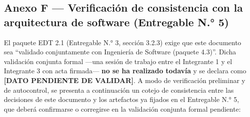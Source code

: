 \documentclass[11pt,a4paper]{article}
\begin{document}
\subsection{Anexo F --- Verificación de consistencia con la arquitectura de software (Entregable N.° 5)}\label{anexo-f-verificaciuxf3n-de-consistencia-con-la-arquitectura-de-software-entregable-n.-5}

El paquete EDT 2.1 (Entregable N.° 3, sección 3.2.3) exige que este documento sea ``validado conjuntamente con Ingeniería de Software (paquete 4.3)''. Dicha validación conjunta formal ---una sesión de trabajo entre el Integrante 1 y el Integrante 3 con acta firmada--- \textbf{no se ha realizado todavía} y se declara como \textbf{{[}DATO PENDIENTE DE VALIDAR{]}}. A modo de verificación preliminar y de autocontrol, se presenta a continuación un cotejo de consistencia entre las decisiones de este documento y los artefactos ya fijados en el Entregable N.° 5, que deberá confirmarse o corregirse en la validación conjunta formal pendiente:
\end{document}
